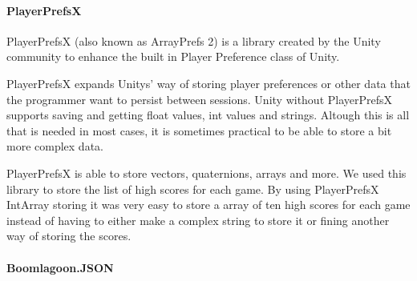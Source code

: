 \paragraph{PlayerPrefsX}
PlayerPrefsX (also known as ArrayPrefs 2)\cite{PlayerPrefsX} is a library created by the Unity community to enhance the built in Player Preference class of Unity.

PlayerPrefsX expands Unitys' way of storing player preferences or other data that the programmer want to persist between sessions.
Unity without PlayerPrefsX supports saving and getting float values, int values and strings. Altough this is all that is needed in most cases, it is sometimes practical to be able to store a bit more complex data.

PlayerPrefsX is able to store vectors, quaternions, arrays and more. 
We used this library to store the list of high scores for each game. 
By using PlayerPrefsX IntArray storing it was very easy to store a array of ten high scores for each game instead of having to either make a complex string to store it or fining another way of storing the scores.

\paragraph{Boomlagoon.JSON}
